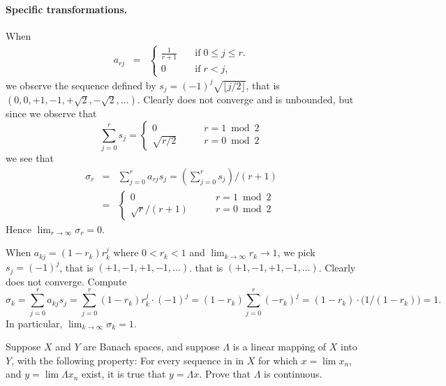 \begin{enumerate}
\paragraph{Specific transformations.}
When 
\begin{eqnarray*}
a_{rj} &=&
   \left\{\begin{array}{ll}
          \frac{1}{r+1} & \quad \textrm{if}\; 0\leq j \leq r. \\
          0             & \quad \textrm{if}\; r < j,
          \end{array}\right.
\end{eqnarray*}
we observe the sequence  defined by 
\(s_j = (-1)^j\sqrt{\lfloor j/2\rfloor}\), 
that is \((0,0,+1,-1,+\sqrt{2},-\sqrt{2},\ldots)\).
Clearly does not converge and is unbounded, but since
we observe that 
\[\sum_{j=0}^r s_j 
  = \left\{\begin{array}{ll}
          0 & \qquad r = 1 \bmod 2 \\
          \sqrt{r/2} & \qquad r = 0 \bmod 2 
          \end{array}\right.\]
we see that 
\begin{eqnarray*}
\sigma_r 
&=& \sum_{j=0}^r a_{rj}s_j
 = \left(\sum_{j=0}^r s_j\right)/(r+1) \\
&=& \left\{\begin{array}{ll}
          0 & \qquad r = 1 \bmod 2 \\
          \sqrt{r}/(r+1) & \qquad r = 0 \bmod 2 
          \end{array}\right.
\end{eqnarray*}
Hence \(\lim_{r\to\infty}\sigma_r = 0\).

When \(a_{kj} = (1-r_k)r_k^j\) 
where \(0<r_k<1\) and \(\lim_{k\to\infty} r_k\to 1\),
we pick
\(s_j = (-1)^j\), that is \((+1,-1,+1,-1,\ldots)\).
that is \((+1,-1,+1,-1,\ldots)\).
Clearly does not converge. Compute
\[
\sigma_k
= \sum_{j=0}^r a_{kj}s_j
 =  \sum_{j=0}^r (1-r_k)r_k^j \cdot (-1)^j
 = (1-r_k)\sum_{j=0}^r (-r_k)^j 
 = (1-r_k) \cdot \bigl(1/(1-r_k)\bigr) = 1.\]
In particular,  \(\lim_{k\to\infty}\sigma_k=1\).



\begin{excopy}
Suppose $X$ and $Y$ are Banach spaces, and suppose \(\Lambda\)
is a linear mapping of $X$ into $Y$, with the following property:
For every sequence  in in $X$ for which \(x = \lim x_n\),
and \(y = \lim \Lambda x_n\) exist,
it is true that \(y=\Lambda x\). Prove that \(\Lambda\) is continuous.


\end{excopy}
\end{enumerate}
